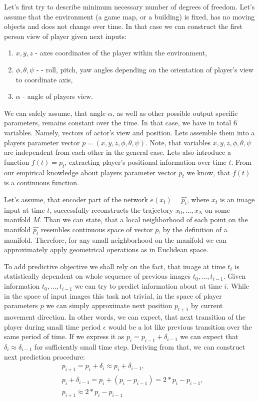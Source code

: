 Let's first try to describe minimum necessary number of degrees of freedom.
Let's assume that the environment (a game map, or a building) is fixed, has no moving objects and does not change over time.
In that case we can construct the first person view of player given next inputs:
\begin{enumerate}
  \item $x, y, z$ - axes coordinates of the player within the environment,
  \item $\phi, \theta, \psi$ -  - roll, pitch, yaw angles depending on the orientation of player's view to coordinate axis,
  \item $\alpha$ - angle of players view.
\end{enumerate}

We can safely assume, that angle $\alpha$, as well as other possible output specific parameters, remains constant over the time.
In that case, we have in total 6 variables.
Namely, vectors of actor's view and position.
Lets assemble them into a players parameter vector $p=(x, y, z, \phi, \theta, \psi)$.
Note, that variables $x, y, z, \phi, \theta, \psi$ are independent from each other in the general case.
Lets also introduce a function $f(t)=p_t$, extracting player's positional information over time $t$.
From our empirical knowledge about players parameter vector $p_t$ we know, that $f(t)$ is a continuous function.

Let's assume, that encoder part of the network $e(x_t)= \hat{p_t}$, where $x_t$ is an image input at time $t$, successfully reconstructs the trajectory ${x_0, \ldots, x_N}$ on some manifold $M$.
Than we can state, that a local neighborhood of each point on the manifold $\hat{p_t}$ resembles continuous space of vector $p$, by the definition of a manifold.
Therefore, for any small neighborhood on the manifold we can approximately apply geometrical operations as in Euclidean space.

To add predictive objective we shall rely on the fact, that image at time $t_i$ is statistically dependent on whole sequence of previous images ${t_0, \ldots, t_{i-1}}$.
Given information ${t_0, \ldots, t_{i-1}}$ we can try to predict information about at time $i$.
While in the space of input images this task not trivial, in the space of player parameters $p$ we can simply approximate next position $p_{t+1}$ by current movement direction.
In other words, we can expect, that next transition of the player during small time period $\epsilon$ would be a lot like previous transition over the same period of time.
If we express it as $p_i = p_{i-1} + \delta_{i-1}$ we can expect that $\delta_i \approx \delta_{i-1}$ for sufficiently small time step. Deriving from that, we can construct next prediction procedure:
\begin{equation}
  \begin{aligned}
    &p_{i+1} = p_i + \delta_i \approx p_i + \delta_{i-1},\\
    &p_i + \delta_{i-1} = p_i + (p_i - p_{i-1}) = 2*p_i - p_{i-1}, \\
    &p_{i+1} \approx 2*p_i - p_{i-1}
  \end{aligned}
\end{equation}


